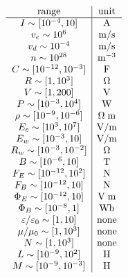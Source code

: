 \documentclass[12pt]{article}
\newcommand \vpx [1]{\vspace{#1px}}
\newcommand \eps \varepsilon
\newcommand \A {\mathrm A} %
\newcommand \F {\mathrm F} %
\renewcommand\H{\mathrm H} %
\newcommand \N {\mathrm N} %
\newcommand \T {\mathrm T} %
\newcommand \V {\mathrm V} %
\newcommand \W {\mathrm W} %
\newcommand \s {\mathrm s} %
\newcommand \m {\mathrm m} %
\newcommand \Wb {\mathrm{Wb}} %
\begin{document}
$\hfill \begin{array}{c|c}
	\text{range}					& \text{unit}	\\ \hline
	I \sim [10^{-4}, 10]			& \A			\\ %
	v_e \sim 10^6					& \m / \s		\\ %
	v_d \sim 10^{-4}				& \m / \s		\\ %
	n \sim 10^{28}					& \m^{-3}		\\ %
	C \sim [10^{-12}, 10^{-3}]		& \F			\\ %
	R \sim [1, 10^3]				& \Omega		\\ %
	V \sim [1, 200]					& \V			\\ %
	P \sim [10^{-3}, 10^4]			& \W			\\ %
	\rho \sim [10^{-9}, 10^{-6}]	& \Omega \; \m	\\ %
	E_c \sim [10^3, 10^7]			& \V / \m		\\ %
	E_w \sim [10^{-3}, 10]			& \V / \m		\\ %
	R_w \sim [10^{-3}, 10^{-2}]		& \Omega		\\ %
	B \sim [10^{-6}, 10]			& \T			\\ %

	F_E \sim [10^{-12}, 10^2]		& \N			\\ %
	F_B \sim [10^{-12}, 10]			& \N			\\ %

	\Phi_E \sim [10^{-12}, 10]		& \V \; \m		\\ %
	\Phi_B \sim [10^{-8}, 1]		& \Wb			\\ %

	\eps/\eps_0 \sim [1, 10]		& \text{none}	\\ %
	\mu/\mu_0 \sim [1, 10^3]		& \text{none}	\\ %

	N \sim [1, 10^3]				& \text{none}	\\ %
	L \sim [10^{-9}, 10^2]			& \H			\\ %
	M \sim [10^{-9}, 10^{-3}]		& \H			\\ %
\end{array} \hfill$

\vpx{20}
\end{document}
